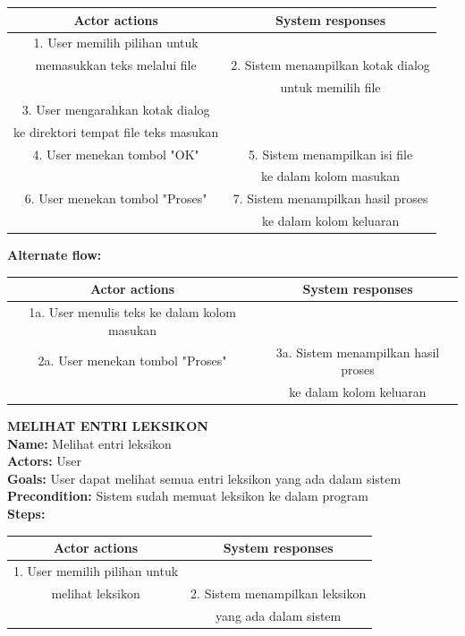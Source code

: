 \begin{table}[H]
\centering
\begin{tabular}{|c|c|}
\hline
\textbf{Actor actions} & \textbf{System responses} \\
\hline
1. User memilih pilihan untuk& \\memasukkan teks melalui file&
2. Sistem menampilkan kotak dialog \\&untuk memilih file\\
3. User mengarahkan kotak dialog&\\ ke direktori tempat file teks masukan&\\
4. User menekan tombol "OK"&
5. Sistem menampilkan isi file \\&ke dalam kolom masukan\\
6. User menekan tombol "Proses"&7. Sistem menampilkan hasil proses\\&ke dalam kolom keluaran\\
\hline
\end{tabular}
\end{table}

\textbf{Alternate flow:}

\begin{table}[H]
\centering
\begin{tabular}{|c|c|}
\hline
\textbf{Actor actions} & \textbf{System responses} \\
\hline
1a. User menulis teks ke dalam kolom masukan&\\
2a. User menekan tombol "Proses"&3a. Sistem menampilkan hasil proses\\&ke dalam kolom keluaran\\
\hline
\end{tabular}
\end{table}

\textbf{MELIHAT ENTRI LEKSIKON}\\
\textbf{Name:} Melihat entri leksikon\\
\textbf{Actors:} User\\
\textbf{Goals:} User dapat melihat semua entri leksikon yang ada dalam sistem\\
\textbf{Precondition:} Sistem sudah memuat leksikon ke dalam program\\
\textbf{Steps:}

\begin{table}[H]
\centering
\begin{tabular}{|c|c|}
\hline
\textbf{Actor actions} & \textbf{System responses} \\
\hline
1. User memilih pilihan untuk&\\melihat leksikon&
2. Sistem menampilkan leksikon\\&yang ada dalam sistem \\
\hline
\end{tabular}
\end{table}

